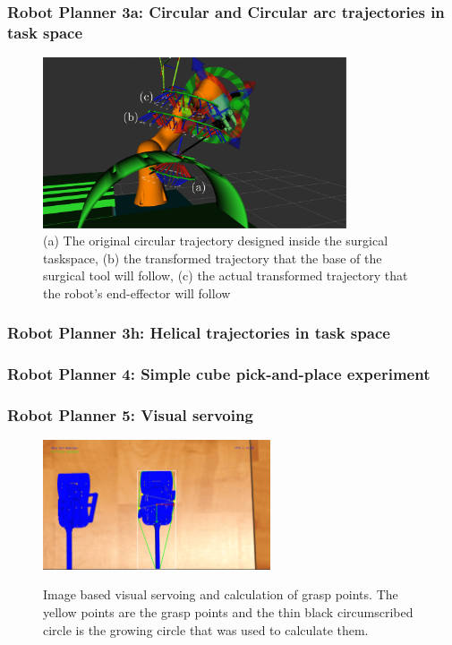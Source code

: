 \begin{frame}
\frametitle{Robot Planner 3a: Circular and Circular arc trajectories in task space}
\begin{center}
\begin{figure}[!htb]
\centering
\includegraphics[width=0.8\textwidth]{../images/robot_planner3/3a_circle_details.png}
\caption{(a) The original circular trajectory designed inside the surgical taskspace, (b) the transformed trajectory that the base of the surgical tool will
 follow, (c) the actual transformed trajectory that the robot's end-effector will follow}
\label{robot-planner3a-circle-details}
\end{figure}
\end{center}
\end{frame}


\begin{frame}
\frametitle{Robot Planner 3h: Helical trajectories in task space}
\end{frame}

\begin{frame}
\frametitle{Robot Planner 4: Simple cube pick-and-place experiment}
\end{frame}

\begin{frame}
\frametitle{Robot Planner 5: Visual servoing}
\begin{center}
\begin{figure}[!htb]
\centering
\includegraphics[width=0.6\textwidth]{../images/grasp-points-triangle.png}\\
\caption{Image based visual servoing and calculation of grasp points. The yellow points are the grasp points and the thin black circumscribed circle is the growing circle that was used to calculate them.}
\end{figure}
\end{center}
\end{frame}

